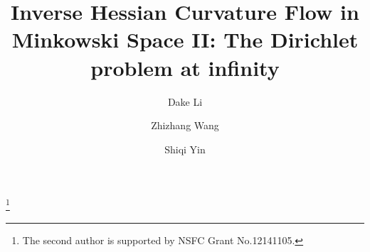 \documentclass[reqno]{amsart}
\theoremstyle{remark}
\theoremstyle{definition}
\numberwithin{equation}{section}
\begin{document}
\title[Inverse curvature flow]
{Inverse Hessian Curvature Flow in Minkowski Space II: The Dirichlet problem at infinity}


\author[D. Li]{Dake Li}
\address[D. Li]{School of Mathematical Science\\
Fudan University\\
200433 Shanghai\\
P.R. China}


\author[Z. Wang]{Zhizhang Wang}
\address[Z. Wang]{School of Mathematical Science\\
Fudan University\\
200433 Shanghai\\
P.R. China}


\author[S. Yin]{Shiqi Yin}
\address[S. Yin]{School of Mathematical Science\\
Fudan University\\
200433 Shanghai\\
P.R. China}



\thanks{The second author is supported by NSFC Grant No.12141105.}


\end{document}
